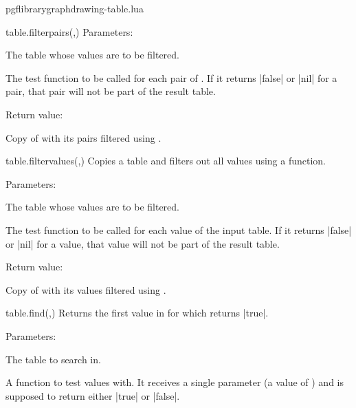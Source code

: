 \begin{filedescription}{pgflibrarygraphdrawing-table.lua}
\begin{luacommand}{{table.filter\textunderscore{}pairs}(,)}
Parameters:
\begin{parameterdescription}
	\item[\meta{table}] The table whose values are to be filtered.\item[\meta{filter\_func}] The test function to be called for each pair of . If it returns |false| or |nil| for a pair, that pair will not be part of the result table. 
\end{parameterdescription}


Return value:
\begin{parameterdescription} 
  \item[] Copy of  with its pairs filtered using . 
\end{parameterdescription}


\end{luacommand}
\begin{luacommand}{{table.filter\textunderscore{}values}(,)}
Copies a table and filters out all values using a function. 

Parameters:
\begin{parameterdescription}
	\item[\meta{input}] The table whose values are to be filtered.\item[\meta{filter\_func}] The test function to be called for each value of the input table. If it returns |false| or |nil| for a value, that value will not be part of the result table. 
\end{parameterdescription}


Return value:
\begin{parameterdescription} 
  \item[] Copy of  with its values filtered using . 
\end{parameterdescription}


\end{luacommand}
\begin{luacommand}{{table.find}(,)}
Returns the first value in  for which  returns |true|. 

Parameters:
\begin{parameterdescription}
	\item[\meta{table}] The table to search in.\item[\meta{find\_func}] A function to test values with. It receives a single parameter (a value of ) and is supposed to return either |true| or |false|. 
\end{parameterdescription}



\end{luacommand}
\end{filedescription}
